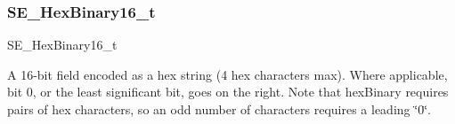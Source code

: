 \subsubsection{\texorpdfstring{S\+E\+\_\+\+Hex\+Binary16\+\_\+t}{SE\_HexBinary16\_t}}
{\footnotesize\ttfamily S\+E\+\_\+\+Hex\+Binary16\+\_\+t}

A 16-\/bit field encoded as a hex string (4 hex characters max). Where applicable, bit 0, or the least significant bit, goes on the right. Note that hex\+Binary requires pairs of hex characters, so an odd number of characters requires a leading \char`\"{}0\char`\"{}. 